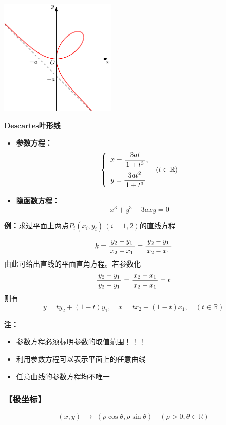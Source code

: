\begin{shaded}
	\begin{center}
		\includegraphics[width=5.5cm]{./images/ch1/dicartesCurve.pdf}

		{\bf Descartes叶形线}
	\end{center}
	\bigskip
	\begin{itemize}
	  \item {\bf 参数方程：}
	  	$$\left\{\begin{array}{l}
	  		x=\displaystyle\frac{\,{3at}\,}{\,{1+t^3}\,},\\[1em] y=\displaystyle\frac{\,{3at^2}\,}{\,{1+t^3}\,}
	  	\end{array}\right.\;(t\in\mathbb{R})$$
	  	\vspace{-1em}
	  \item {\bf 隐函数方程：}
	  	$$x^3+y^3-3axy=0$$
	\end{itemize}
\end{shaded}

{\bf 例：}求过平面上两点$P_i(x_i,y_i)\,(i=1,2)$的直线方程
		  
$$k=\displaystyle\frac{\,{y_2-y_1}\,}{\,{x_2-x_1}\,}=\displaystyle\frac{\,{y_2-y_1}\,}{\,{x_2-x_1}\,}$$
由此可给出直线的平面直角方程。若参数化
$$\displaystyle\frac{\,{y_2-y_1}\,}{\,{y_2-y_1}\,}=\displaystyle\frac{\,{x_2-x_1}\,}{\,{x_2-x_1}\,}=t$$
则有
$$y=ty_2+(1-t)y_1,\quad x=tx_2+(1-t)x_1,\quad (t\in\mathbb{R})$$
		  
{\bf 注：}
\begin{itemize}
  \setlength{\itemindent}{1cm}
  \item 参数方程必须标明参数的取值范围！！！
  \item {利用参数方程可以表示平面上的任意曲线}
  \item {任意曲线的参数方程均不唯一}
\end{itemize}

\subsubsection{【极坐标】}

$$(x,y)\;\to\;(\rho\cos\theta,\rho\sin\theta)\quad
(\rho>0,\theta\in\mathbb{R})$$
	
